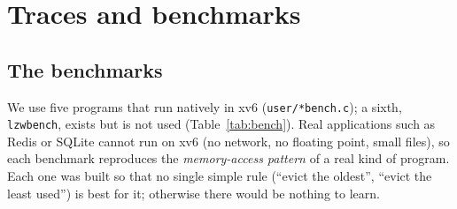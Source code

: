 \documentclass[10.5pt,a4paper]{article}
\newcommand{\code}[1]{\texttt{#1}}
\begin{document}
\begin{table}[!htbp]
\centering\small

\caption{Results at a glance: the per-workload \textbf{linear} model running
inside xv6 at 10\% memory, compared with Clock on the same runs. Test: new
runs of a known program; held-out: program variants never seen in training
(matmul has no test traces: its seed does not change which pages it touches, so each variant was recorded once; n = 64 and 96 are used for training and n = 128 is held out). Decision time: test traces (matmul:
held-out), 10\,MHz kernel timer.}
\label{tab:glance}
\end{table}


\section{Traces and benchmarks}

\subsection{The benchmarks}

We use five programs that run natively in xv6 (\code{user/*bench.c}); a sixth, \code{lzwbench}, exists but is not used (Table~\ref{tab:bench}). Real
applications such as Redis or SQLite cannot run on xv6 (no network, no
floating point, small files), so each benchmark reproduces the
\emph{memory-access pattern} of a real kind of program. Each one was built so
that no single simple rule (``evict the oldest'', ``evict the least
used'') is best for it; otherwise there would be nothing to learn.
\end{document}
